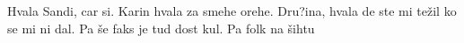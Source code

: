 \zahvala
Hvala Sandi, car si. 
Karin hvala za smehe orehe. 
Dru?ina, hvala de ste mi težil ko se mi ni dal.
Pa še faks je tud dost kul.
Pa folk na šihtu